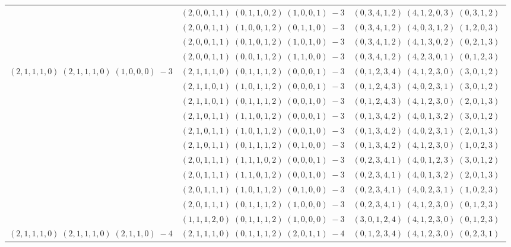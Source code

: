 \documentclass[11pt]{article}
\begin{document}
\begin{longtable}[l]{|c|c|c|}
 \cline{2-3} 
 & $(2 ,0 ,0 ,1 ,1) \;(0 ,1 ,1 ,0 ,2) \;(1 ,0 ,0 ,1) \;-3$ & $(0 ,3 ,4 ,1 ,2) \;(4 ,1 ,2 ,0 ,3) \;(0 ,3 ,1 ,2) \;$\\ 
 \cline{2-3} 
 & $(2 ,0 ,0 ,1 ,1) \;(1 ,0 ,0 ,1 ,2) \;(0 ,1 ,1 ,0) \;-3$ & $(0 ,3 ,4 ,1 ,2) \;(4 ,0 ,3 ,1 ,2) \;(1 ,2 ,0 ,3) \;$\\ 
 \cline{2-3} 
 & $(2 ,0 ,0 ,1 ,1) \;(0 ,1 ,0 ,1 ,2) \;(1 ,0 ,1 ,0) \;-3$ & $(0 ,3 ,4 ,1 ,2) \;(4 ,1 ,3 ,0 ,2) \;(0 ,2 ,1 ,3) \;$\\ 
 \cline{2-3} 
 & $(2 ,0 ,0 ,1 ,1) \;(0 ,0 ,1 ,1 ,2) \;(1 ,1 ,0 ,0) \;-3$ & $(0 ,3 ,4 ,1 ,2) \;(4 ,2 ,3 ,0 ,1) \;(0 ,1 ,2 ,3) \;$\\ \hline\multirow[t]{11}{*}{ $(2 ,1 ,1 ,1 ,0) \;(2 ,1 ,1 ,1 ,0) \;(1 ,0 ,0 ,0) \;-3$ }  & $(2 ,1 ,1 ,1 ,0) \;(0 ,1 ,1 ,1 ,2) \;(0 ,0 ,0 ,1) \;-3$ & $(0 ,1 ,2 ,3 ,4) \;(4 ,1 ,2 ,3 ,0) \;(3 ,0 ,1 ,2) \;$\\ 
 \cline{2-3} 
 & $(2 ,1 ,1 ,0 ,1) \;(1 ,0 ,1 ,1 ,2) \;(0 ,0 ,0 ,1) \;-3$ & $(0 ,1 ,2 ,4 ,3) \;(4 ,0 ,2 ,3 ,1) \;(3 ,0 ,1 ,2) \;$\\ 
 \cline{2-3} 
 & $(2 ,1 ,1 ,0 ,1) \;(0 ,1 ,1 ,1 ,2) \;(0 ,0 ,1 ,0) \;-3$ & $(0 ,1 ,2 ,4 ,3) \;(4 ,1 ,2 ,3 ,0) \;(2 ,0 ,1 ,3) \;$\\ 
 \cline{2-3} 
 & $(2 ,1 ,0 ,1 ,1) \;(1 ,1 ,0 ,1 ,2) \;(0 ,0 ,0 ,1) \;-3$ & $(0 ,1 ,3 ,4 ,2) \;(4 ,0 ,1 ,3 ,2) \;(3 ,0 ,1 ,2) \;$\\ 
 \cline{2-3} 
 & $(2 ,1 ,0 ,1 ,1) \;(1 ,0 ,1 ,1 ,2) \;(0 ,0 ,1 ,0) \;-3$ & $(0 ,1 ,3 ,4 ,2) \;(4 ,0 ,2 ,3 ,1) \;(2 ,0 ,1 ,3) \;$\\ 
 \cline{2-3} 
 & $(2 ,1 ,0 ,1 ,1) \;(0 ,1 ,1 ,1 ,2) \;(0 ,1 ,0 ,0) \;-3$ & $(0 ,1 ,3 ,4 ,2) \;(4 ,1 ,2 ,3 ,0) \;(1 ,0 ,2 ,3) \;$\\ 
 \cline{2-3} 
 & $(2 ,0 ,1 ,1 ,1) \;(1 ,1 ,1 ,0 ,2) \;(0 ,0 ,0 ,1) \;-3$ & $(0 ,2 ,3 ,4 ,1) \;(4 ,0 ,1 ,2 ,3) \;(3 ,0 ,1 ,2) \;$\\ 
 \cline{2-3} 
 & $(2 ,0 ,1 ,1 ,1) \;(1 ,1 ,0 ,1 ,2) \;(0 ,0 ,1 ,0) \;-3$ & $(0 ,2 ,3 ,4 ,1) \;(4 ,0 ,1 ,3 ,2) \;(2 ,0 ,1 ,3) \;$\\ 
 \cline{2-3} 
 & $(2 ,0 ,1 ,1 ,1) \;(1 ,0 ,1 ,1 ,2) \;(0 ,1 ,0 ,0) \;-3$ & $(0 ,2 ,3 ,4 ,1) \;(4 ,0 ,2 ,3 ,1) \;(1 ,0 ,2 ,3) \;$\\ 
 \cline{2-3} 
 & $(2 ,0 ,1 ,1 ,1) \;(0 ,1 ,1 ,1 ,2) \;(1 ,0 ,0 ,0) \;-3$ & $(0 ,2 ,3 ,4 ,1) \;(4 ,1 ,2 ,3 ,0) \;(0 ,1 ,2 ,3) \;$\\ 
 \cline{2-3} 
 & $(1 ,1 ,1 ,2 ,0) \;(0 ,1 ,1 ,1 ,2) \;(1 ,0 ,0 ,0) \;-3$ & $(3 ,0 ,1 ,2 ,4) \;(4 ,1 ,2 ,3 ,0) \;(0 ,1 ,2 ,3) \;$\\ \hline\multirow[t]{51}{*}{ $(2 ,1 ,1 ,1 ,0) \;(2 ,1 ,1 ,1 ,0) \;(2 ,1 ,1 ,0) \;-4$ }  & $(2 ,1 ,1 ,1 ,0) \;(0 ,1 ,1 ,1 ,2) \;(2 ,0 ,1 ,1) \;-4$ & $(0 ,1 ,2 ,3 ,4) \;(4 ,1 ,2 ,3 ,0) \;(0 ,2 ,3 ,1) \;$\\ 

\end{longtable}
\end{document}
